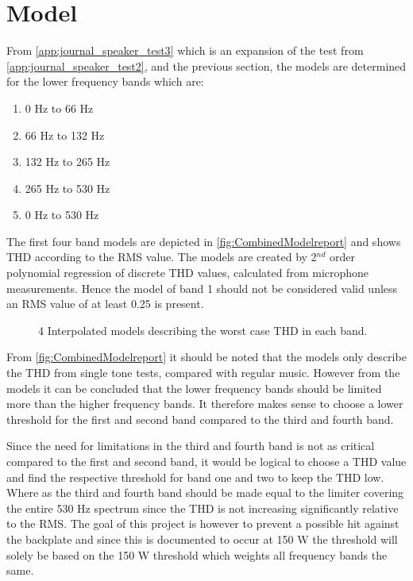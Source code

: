 \section{Model}
From \autoref{app:journal_speaker_test3} which is an expansion of the test from \autoref{app:journal_speaker_test2}, and the previous section, the models are determined for the lower frequency bands which are:
\begin{enumerate}
\item 0 Hz to 66 Hz
\item 66 Hz to 132 Hz
\item 132 Hz to 265 Hz
\item 265 Hz to 530 Hz
\item 0 Hz to 530 Hz
\end{enumerate}
The first four band models are depicted in \autoref{fig:CombinedModelreport} and shows THD according to the RMS value. The models are created by 2$^{nd}$ order polynomial regression of discrete THD values, calculated from microphone measurements. Hence the model of band 1 should not be considered valid unless an RMS value of at least 0.25 is present.

\begin{figure}[H]
    \centering
    
    \caption{4 Interpolated models describing the worst case THD in each band.}
    \label{fig:CombinedModelreport}
\end{figure}

From \autoref{fig:CombinedModelreport} it should be noted that the models only describe the THD from single tone tests, compared with regular music. However from the models it can be concluded that the lower frequency bands should be limited more than the higher frequency bands. It therefore makes sense to choose a lower threshold for the first and second band compared to the third and fourth band. 

\vspace{2mm}
Since the need for limitations in the third and fourth band is not as critical compared to the first and second band, it would be logical to choose a THD value and find the respective threshold for band one and two to keep the THD low. Where as the third and fourth band should be made equal to the limiter covering the entire 530 Hz spectrum since the THD is not increasing significantly relative to the RMS. The goal of this project is however to prevent a possible hit against the backplate and since this is documented to occur at 150 W the threshold will solely be based on the 150 W threshold which weights all frequency bands the same. 